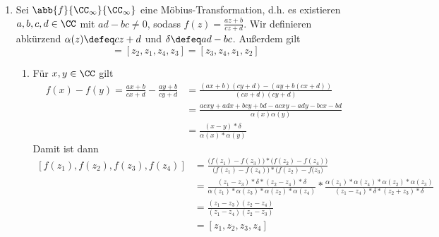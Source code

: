\begin{exercisePage}
	\begin{enumerate}[label=(zu \alph*), leftmargin=*]
		\item Sei $\abb{f}{\CC_\infty}{\CC_\infty}$ eine Möbius-Transformation, d.h. es existieren $a,b,c,d \in \CC$ mit $ad - bc \neq 0$, sodass $f(z) = \frac{az + b}{cz + d}$. Wir definieren abkürzend $\alpha(z) \defeq cz + d$ und $\delta \defeq ad - bc$.
		Außerdem gilt 
		\begin{equation}
			[z_1, z_2, z_3, z_4] = [z_2, z_1, z_4, z_3] = [z_3, z_4, z_1, z_2] 
			\tag{$\star$} \label{3eq: 1}
		\end{equation}
		\begin{enumerate}[label=(\roman*), leftmargin=*]
			\item Für $x,y \in \CC$ gilt
			\begin{equation*}
				\begin{aligned}
					f(x) - f(y) = \frac{ax + b}{cx + d} - \frac{ay + b}{cy + d} 
					&= \frac{(ax + b) (cy + d) - (ay + b (cx + d))}{(cx + d)(cy + d)} \\
					&= \frac{ac x y + ad x + bc y + bd - ac x y - ad y - bc x  - bd}{\alpha(x) \alpha(y)} \\
					&= \frac{(x-y) * \delta}{\alpha(x) * \alpha(y)}
				\end{aligned} 
			\end{equation*}
			Damit ist dann
			\begin{equation*}
				\begin{aligned}
					[f(z_1), f(z_2), f(z_3), f(z_4)] 
					&= \frac{\Big( f(z_1) - f(z_3) \Big) * \Big( f(z_2) - f(z_4) \Big)}{\Big( f(z_1) - f(z_4) \Big) * \Big( f(z_2) - f(z_3 \Big)} \\
					&= \frac{(z_1 - z_3) * \delta * (z_2 - z_4) * \delta}{\alpha(z_1) * \alpha(z_3) * \alpha(z_2) * \alpha(z_4)} * \frac{\alpha(z_1) * \alpha(z_4) * \alpha(z_2) * \alpha(z_3)}{(z_1 - z_4) * \delta * (z_2 + z_3) * \delta} \\
					&= \frac{(z_1 - z_3) (z_2 - z_4)}{(z_1 - z_4) (z_2 - z_3)} \\
					&= [z_1, z_2, z_3, z_4] 
				\end{aligned}
			\end{equation*}
			

\end{enumerate}
\end{enumerate}
\end{exercisePage}
